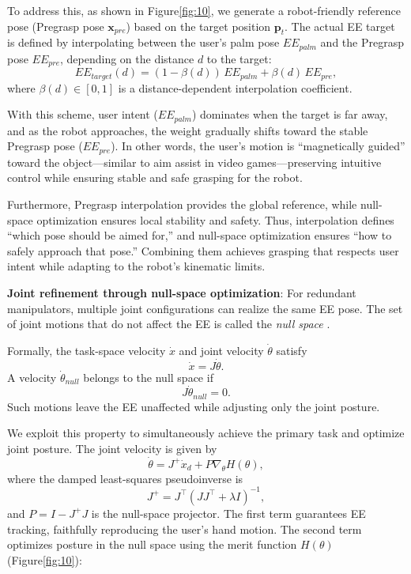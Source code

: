 \documentclass[../../main.tex]{subfiles} %
\begin{document}
To address this, as shown in Figure\ref{fig:10}, we generate a robot-friendly 
reference pose (Pregrasp pose $\mathbf{x}_{pre}$) based on the target position $\mathbf{p}_t$.  
The actual EE target is defined by interpolating between the user’s palm pose $EE_{palm}$ and 
the Pregrasp pose $EE_{pre}$, depending on the distance $d$ to the target:
\begin{equation}
EE_{target}(d) = (1-\beta(d))\,EE_{palm} + \beta(d)\,EE_{pre},
\end{equation}
where $\beta(d)\in[0,1]$ is a distance-dependent interpolation coefficient.

With this scheme, user intent ($EE_{palm}$) dominates when the target is far away, and as the robot approaches, 
the weight gradually shifts toward the stable Pregrasp pose ($EE_{pre}$).  
In other words, the user’s motion is “magnetically guided” toward the 
object—similar to aim assist in video games—preserving 
intuitive control while ensuring stable and safe grasping for the robot.

Furthermore, Pregrasp interpolation provides the global reference, 
while null-space optimization ensures local stability and safety.  
Thus, interpolation defines “which pose should be aimed for,” 
and null-space optimization ensures “how to safely approach that pose.”  
Combining them achieves grasping that respects user intent while adapting to the robot’s kinematic limits.  


\medskip
\textbf{Joint refinement through null-space optimization}:  
For redundant manipulators, multiple joint configurations can realize the same EE pose.  
The set of joint motions that do not affect the EE is called the \textit{null space} \cite{Null1}\cite{Null2}.  

Formally, the task-space velocity $\dot{x}$ and joint velocity $\dot{\theta}$ satisfy
\begin{equation}
\dot{x} = J \dot{\theta}.
\end{equation}
A velocity $\dot{\theta}_{null}$ belongs to the null space if
\begin{equation}
J \dot{\theta}_{null} = 0.
\end{equation}
Such motions leave the EE unaffected while adjusting only the joint posture.

We exploit this property to simultaneously achieve the primary task and optimize joint posture.  
The joint velocity is given by
\begin{equation}
\dot{\theta} = J^+ \dot{x}_d + P \nabla_\theta H(\theta),
\end{equation}
where the damped least-squares pseudoinverse is
\begin{equation}
J^+ = J^\top (JJ^\top + \lambda I)^{-1},
\end{equation}
and $P = I - J^+ J$ is the null-space projector.  
The first term guarantees EE tracking, faithfully reproducing the user’s hand motion.  
The second term optimizes posture in the null space using the merit function $H(\theta)$ (Figure\ref{fig:10}):
\end{document}
